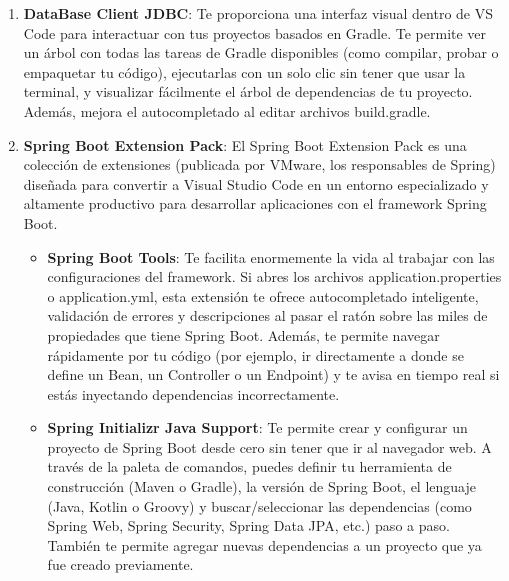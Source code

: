 \begin{enumerate}
\begin{itemize}
		\item \textbf{Gradle for Java}:Te proporciona una interfaz visual dentro de VS Code para interactuar con tus proyectos basados en Gradle. Te permite ver un árbol con todas las tareas de Gradle disponibles (como compilar, probar o empaquetar tu código), ejecutarlas con un solo clic sin tener que usar la terminal, y visualizar fácilmente el árbol de dependencias de tu proyecto. Además, mejora el autocompletado al editar archivos build.gradle.
	\end{itemize}
	\item \textbf{DataBase Client JDBC}: Te proporciona una interfaz visual dentro de VS Code para interactuar con tus proyectos basados en Gradle. Te permite ver un árbol con todas las tareas de Gradle disponibles (como compilar, probar o empaquetar tu código), ejecutarlas con un solo clic sin tener que usar la terminal, y visualizar fácilmente el árbol de dependencias de tu proyecto. Además, mejora el autocompletado al editar archivos build.gradle.
	\item \textbf{Spring Boot Extension Pack}: El Spring Boot Extension Pack es una colección de extensiones (publicada por VMware, los responsables de Spring) diseñada para convertir a Visual Studio Code en un entorno especializado y altamente productivo para desarrollar aplicaciones con el framework Spring Boot.
	\begin{itemize}
		\item \textbf{Spring Boot Tools}: Te facilita enormemente la vida al trabajar con las configuraciones del framework. Si abres los archivos application.properties o application.yml, esta extensión te ofrece autocompletado inteligente, validación de errores y descripciones al pasar el ratón sobre las miles de propiedades que tiene Spring Boot. Además, te permite navegar rápidamente por tu código (por ejemplo, ir directamente a donde se define un Bean, un Controller o un Endpoint) y te avisa en tiempo real si estás inyectando dependencias incorrectamente.
		\item \textbf{Spring Initializr Java Support}: Te permite crear y configurar un proyecto de Spring Boot desde cero sin tener que ir al navegador web. A través de la paleta de comandos, puedes definir tu herramienta de construcción (Maven o Gradle), la versión de Spring Boot, el lenguaje (Java, Kotlin o Groovy) y buscar/seleccionar las dependencias (como Spring Web, Spring Security, Spring Data JPA, etc.) paso a paso. También te permite agregar nuevas dependencias a un proyecto que ya fue creado previamente.

\end{itemize}
\end{enumerate}
